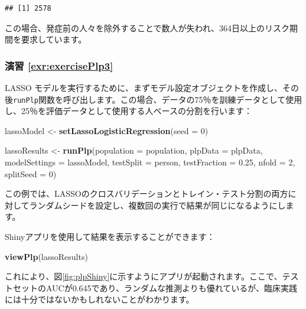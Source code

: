 \documentclass[
  11pt]{book}
\newenvironment{Shaded}{\begin{snugshade}}{\end{snugshade}}
\newcommand{\AttributeTok}[1]{\textcolor[rgb]{0.13,0.29,0.53}{#1}}
\newcommand{\DecValTok}[1]{\textcolor[rgb]{0.00,0.00,0.81}{#1}}
\newcommand{\FloatTok}[1]{\textcolor[rgb]{0.00,0.00,0.81}{#1}}
\newcommand{\FunctionTok}[1]{\textcolor[rgb]{0.13,0.29,0.53}{\textbf{#1}}}
\newcommand{\NormalTok}[1]{#1}
\newcommand{\OtherTok}[1]{\textcolor[rgb]{0.56,0.35,0.01}{#1}}
\newcommand{\StringTok}[1]{\textcolor[rgb]{0.31,0.60,0.02}{#1}}
\theoremstyle{definition}
\theoremstyle{definition}
\theoremstyle{definition}
\theoremstyle{definition}
\theoremstyle{remark}
\begin{document}
\begin{verbatim}
## [1] 2578
\end{verbatim}

この場合、発症前の人々を除外することで数人が失われ、364日以上のリスク期間を要求しています。

\subsubsection*{演習 \ref{exr:exercisePlp3}}\label{ux6f14ux7fd2-refexrexerciseplp3}

LASSO モデルを実行するために、まずモデル設定オブジェクトを作成し、その後\texttt{runPlp}関数を呼び出します。この場合、データの75％を訓練データとして使用し、25％を評価データとして使用する人ベースの分割を行います：

\begin{Shaded}
\begin{Highlighting}[]
\NormalTok{lassoModel }\OtherTok{\textless{}{-}} \FunctionTok{setLassoLogisticRegression}\NormalTok{(}\AttributeTok{seed =} \DecValTok{0}\NormalTok{)}

\NormalTok{lassoResults }\OtherTok{\textless{}{-}} \FunctionTok{runPlp}\NormalTok{(}\AttributeTok{population =}\NormalTok{ population,}
                       \AttributeTok{plpData =}\NormalTok{ plpData,}
                       \AttributeTok{modelSettings =}\NormalTok{ lassoModel,}
                       \AttributeTok{testSplit =} \StringTok{\textquotesingle{}person\textquotesingle{}}\NormalTok{,}
                       \AttributeTok{testFraction =} \FloatTok{0.25}\NormalTok{,}
                       \AttributeTok{nfold =} \DecValTok{2}\NormalTok{,}
                       \AttributeTok{splitSeed =} \DecValTok{0}\NormalTok{)}
\end{Highlighting}
\end{Shaded}

この例では、LASSOのクロスバリデーションとトレイン・テスト分割の両方に対してランダムシードを設定し、複数回の実行で結果が同じになるようにします。

Shinyアプリを使用して結果を表示することができます：

\begin{Shaded}
\begin{Highlighting}[]
\FunctionTok{viewPlp}\NormalTok{(lassoResults)}
\end{Highlighting}
\end{Shaded}

これにより、図\ref{fig:plpShiny}に示すようにアプリが起動されます。ここで、テストセットのAUCが0.645であり、ランダムな推測よりも優れているが、臨床実践には十分ではないかもしれないことがわかります。
\end{document}
